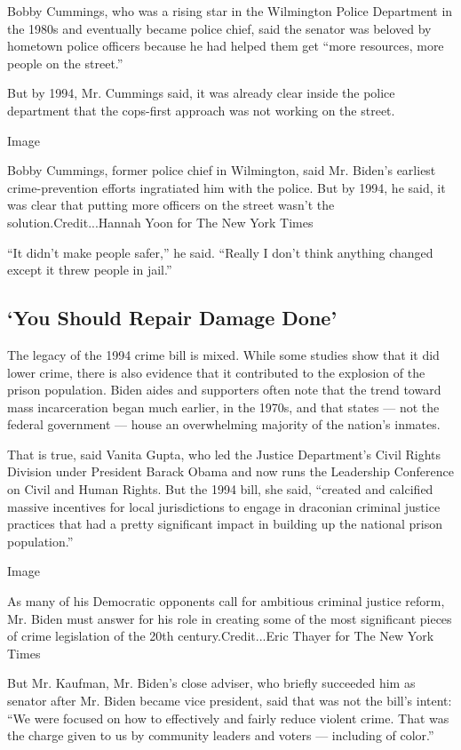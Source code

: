Bobby Cummings, who was a rising star in the Wilmington Police
Department in the 1980s and eventually became police chief, said the
senator was beloved by hometown police officers because he had helped
them get ``more resources, more people on the street.''

But by 1994, Mr. Cummings said, it was already clear inside the police
department that the cops-first approach was not working on the street.

Image

Bobby Cummings, former police chief in Wilmington, said Mr. Biden's
earliest crime-prevention efforts ingratiated him with the police. But
by 1994, he said, it was clear that putting more officers on the street
wasn't the solution.Credit...Hannah Yoon for The New York Times

``It didn't make people safer,'' he said. ``Really I don't think
anything changed except it threw people in jail.''

\hypertarget{you-should-repair-damage-done}{%
\subsection{`You Should Repair Damage
Done'}\label{you-should-repair-damage-done}}

The legacy of the 1994 crime bill is mixed. While some studies show that
it did lower crime, there is also evidence that it contributed to the
explosion of the prison population. Biden aides and supporters often
note that the trend toward mass incarceration began much earlier, in the
1970s, and that states --- not the federal government --- house an
overwhelming majority of the nation's inmates.

That is true, said Vanita Gupta, who led the Justice Department's Civil
Rights Division under President Barack Obama and now runs the Leadership
Conference on Civil and Human Rights. But the 1994 bill, she said,
``created and calcified massive incentives for local jurisdictions to
engage in draconian criminal justice practices that had a pretty
significant impact in building up the national prison population.''

Image

As many of his Democratic opponents call for ambitious criminal justice
reform, Mr. Biden must answer for his role in creating some of the most
significant pieces of crime legislation of the 20th
century.Credit...Eric Thayer for The New York Times

But Mr. Kaufman, Mr. Biden's close adviser, who briefly succeeded him as
senator after Mr. Biden became vice president, said that was not the
bill's intent: ``We were focused on how to effectively and fairly reduce
violent crime. That was the charge given to us by community leaders and
voters --- including of color.''

